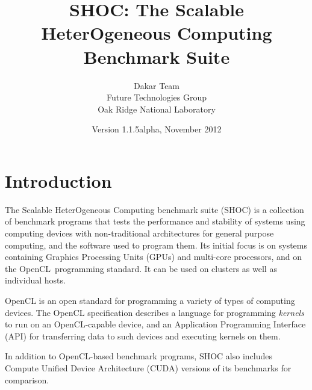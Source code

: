 \documentclass[11pt]{article}
\begin{document}
\title{SHOC: The Scalable HeterOgeneous Computing Benchmark Suite}
\author{Dakar Team\\Future Technologies Group\\Oak Ridge National Laboratory}
\date{Version 1.1.5alpha, November 2012}
\maketitle

\section{Introduction}

The Scalable HeterOgeneous Computing benchmark suite (SHOC) is a collection of
benchmark programs that tests the performance and stability of systems using 
computing devices with non-traditional architectures for general purpose 
computing, and the software used to program them. Its initial focus is on 
systems containing Graphics Processing Units (GPUs) and multi-core 
processors, and on the OpenCL\,\cite{openclspec} programming standard.
It can be used on clusters as well as individual hosts.

OpenCL is an open standard for programming a variety of types of computing 
devices. The OpenCL specification describes a language for programming 
\emph{kernels} to run on an OpenCL-capable device, and an 
Application Programming Interface (API) for transferring data to such 
devices and executing kernels on them. 


In addition to OpenCL-based benchmark programs, SHOC also includes
Compute Unified Device Architecture (CUDA)\cite{cuda} versions
of its benchmarks for comparison.


\end{document}
